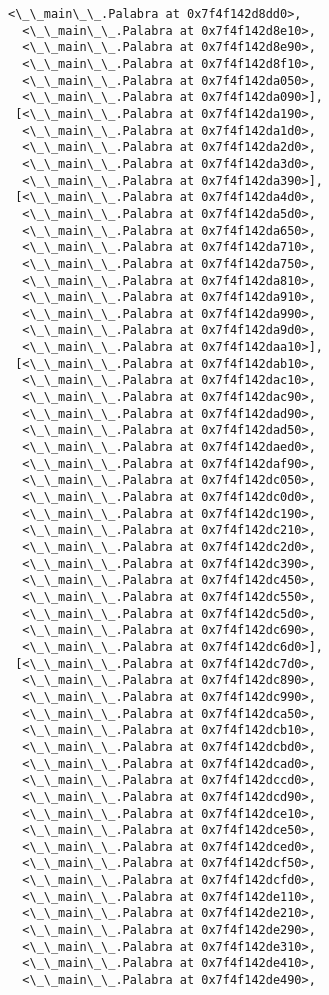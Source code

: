 \documentclass[12pt,a4paper,table]{article}
\begin{document}
\begin{tcolorbox}[breakable, size=fbox, boxrule=.5pt, pad at break*=1mm, opacityfill=0]
\begin{Verbatim}[commandchars=\\\{\}]
  <\_\_main\_\_.Palabra at 0x7f4f142d8dd0>,
  <\_\_main\_\_.Palabra at 0x7f4f142d8e10>,
  <\_\_main\_\_.Palabra at 0x7f4f142d8e90>,
  <\_\_main\_\_.Palabra at 0x7f4f142d8f10>,
  <\_\_main\_\_.Palabra at 0x7f4f142da050>,
  <\_\_main\_\_.Palabra at 0x7f4f142da090>],
 [<\_\_main\_\_.Palabra at 0x7f4f142da190>,
  <\_\_main\_\_.Palabra at 0x7f4f142da1d0>,
  <\_\_main\_\_.Palabra at 0x7f4f142da2d0>,
  <\_\_main\_\_.Palabra at 0x7f4f142da3d0>,
  <\_\_main\_\_.Palabra at 0x7f4f142da390>],
 [<\_\_main\_\_.Palabra at 0x7f4f142da4d0>,
  <\_\_main\_\_.Palabra at 0x7f4f142da5d0>,
  <\_\_main\_\_.Palabra at 0x7f4f142da650>,
  <\_\_main\_\_.Palabra at 0x7f4f142da710>,
  <\_\_main\_\_.Palabra at 0x7f4f142da750>,
  <\_\_main\_\_.Palabra at 0x7f4f142da810>,
  <\_\_main\_\_.Palabra at 0x7f4f142da910>,
  <\_\_main\_\_.Palabra at 0x7f4f142da990>,
  <\_\_main\_\_.Palabra at 0x7f4f142da9d0>,
  <\_\_main\_\_.Palabra at 0x7f4f142daa10>],
 [<\_\_main\_\_.Palabra at 0x7f4f142dab10>,
  <\_\_main\_\_.Palabra at 0x7f4f142dac10>,
  <\_\_main\_\_.Palabra at 0x7f4f142dac90>,
  <\_\_main\_\_.Palabra at 0x7f4f142dad90>,
  <\_\_main\_\_.Palabra at 0x7f4f142dad50>,
  <\_\_main\_\_.Palabra at 0x7f4f142daed0>,
  <\_\_main\_\_.Palabra at 0x7f4f142daf90>,
  <\_\_main\_\_.Palabra at 0x7f4f142dc050>,
  <\_\_main\_\_.Palabra at 0x7f4f142dc0d0>,
  <\_\_main\_\_.Palabra at 0x7f4f142dc190>,
  <\_\_main\_\_.Palabra at 0x7f4f142dc210>,
  <\_\_main\_\_.Palabra at 0x7f4f142dc2d0>,
  <\_\_main\_\_.Palabra at 0x7f4f142dc390>,
  <\_\_main\_\_.Palabra at 0x7f4f142dc450>,
  <\_\_main\_\_.Palabra at 0x7f4f142dc550>,
  <\_\_main\_\_.Palabra at 0x7f4f142dc5d0>,
  <\_\_main\_\_.Palabra at 0x7f4f142dc690>,
  <\_\_main\_\_.Palabra at 0x7f4f142dc6d0>],
 [<\_\_main\_\_.Palabra at 0x7f4f142dc7d0>,
  <\_\_main\_\_.Palabra at 0x7f4f142dc890>,
  <\_\_main\_\_.Palabra at 0x7f4f142dc990>,
  <\_\_main\_\_.Palabra at 0x7f4f142dca50>,
  <\_\_main\_\_.Palabra at 0x7f4f142dcb10>,
  <\_\_main\_\_.Palabra at 0x7f4f142dcbd0>,
  <\_\_main\_\_.Palabra at 0x7f4f142dcad0>,
  <\_\_main\_\_.Palabra at 0x7f4f142dccd0>,
  <\_\_main\_\_.Palabra at 0x7f4f142dcd90>,
  <\_\_main\_\_.Palabra at 0x7f4f142dce10>,
  <\_\_main\_\_.Palabra at 0x7f4f142dce50>,
  <\_\_main\_\_.Palabra at 0x7f4f142dced0>,
  <\_\_main\_\_.Palabra at 0x7f4f142dcf50>,
  <\_\_main\_\_.Palabra at 0x7f4f142dcfd0>,
  <\_\_main\_\_.Palabra at 0x7f4f142de110>,
  <\_\_main\_\_.Palabra at 0x7f4f142de210>,
  <\_\_main\_\_.Palabra at 0x7f4f142de290>,
  <\_\_main\_\_.Palabra at 0x7f4f142de310>,
  <\_\_main\_\_.Palabra at 0x7f4f142de410>,
  <\_\_main\_\_.Palabra at 0x7f4f142de490>,

\end{Verbatim}
\end{tcolorbox}
\end{document}
